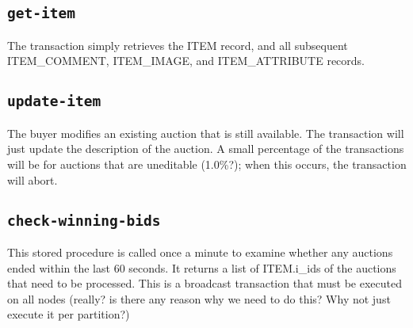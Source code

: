 \documentclass[a4paper,10pt]{article}
\begin{document}
\subsection{\texttt{get-item}}
The transaction simply retrieves the ITEM record, and all subsequent ITEM\_COMMENT, ITEM\_IMAGE, and ITEM\_ATTRIBUTE records. \\

\noindent {}

\subsection{\texttt{update-item}}
The buyer modifies an existing auction that is still available. The transaction will just update the description of the auction. A small percentage of the transactions will be for auctions that are uneditable (1.0\%?); when this occurs, the transaction will abort. \\

\noindent {}

\subsection{\texttt{check-winning-bids}}
This stored procedure is called once a minute to examine whether any auctions ended within the last 60 seconds. It returns a list of ITEM.i\_ids of the auctions that need to be processed. This is a broadcast transaction that must be executed on all nodes (really? is there any reason why we need to do this? Why not just execute it per partition?) \\
\end{document}
